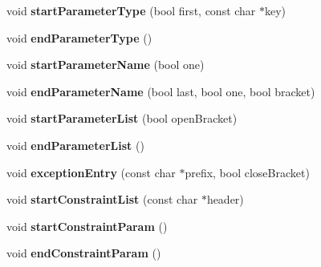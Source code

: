 \begin{DoxyCompactItemize}
\item 
\hypertarget{class_output_list_a563b7005db4ba17663f4f4b32b816b94}{void {\bfseries start\-Parameter\-Type} (bool first, const char $\ast$key)}\label{class_output_list_a563b7005db4ba17663f4f4b32b816b94}

\item 
\hypertarget{class_output_list_a1e61ed71851d9423940748df3342715b}{void {\bfseries end\-Parameter\-Type} ()}\label{class_output_list_a1e61ed71851d9423940748df3342715b}

\item 
\hypertarget{class_output_list_adc242083cf16355c806cca0244f4cd9e}{void {\bfseries start\-Parameter\-Name} (bool one)}\label{class_output_list_adc242083cf16355c806cca0244f4cd9e}

\item 
\hypertarget{class_output_list_a0c0d481e87d25ee396fb723755b03cf9}{void {\bfseries end\-Parameter\-Name} (bool last, bool one, bool bracket)}\label{class_output_list_a0c0d481e87d25ee396fb723755b03cf9}

\item 
\hypertarget{class_output_list_a8e132c555a794fce66878c0b0bc020f1}{void {\bfseries start\-Parameter\-List} (bool open\-Bracket)}\label{class_output_list_a8e132c555a794fce66878c0b0bc020f1}

\item 
\hypertarget{class_output_list_a18eb29acbeb3f72b0d8f4ea23b21f054}{void {\bfseries end\-Parameter\-List} ()}\label{class_output_list_a18eb29acbeb3f72b0d8f4ea23b21f054}

\item 
\hypertarget{class_output_list_af9649c307bacff5a122096b1c997aa61}{void {\bfseries exception\-Entry} (const char $\ast$prefix, bool close\-Bracket)}\label{class_output_list_af9649c307bacff5a122096b1c997aa61}

\item 
\hypertarget{class_output_list_aac7d7fcb1bc8612b62674284916df03b}{void {\bfseries start\-Constraint\-List} (const char $\ast$header)}\label{class_output_list_aac7d7fcb1bc8612b62674284916df03b}

\item 
\hypertarget{class_output_list_afd7a8f4d6caba86120db8bff0fa37422}{void {\bfseries start\-Constraint\-Param} ()}\label{class_output_list_afd7a8f4d6caba86120db8bff0fa37422}

\item 
\hypertarget{class_output_list_a01ad4ae7d141c58991b7a9575a67b6cb}{void {\bfseries end\-Constraint\-Param} ()}\label{class_output_list_a01ad4ae7d141c58991b7a9575a67b6cb}


\end{DoxyCompactItemize}
